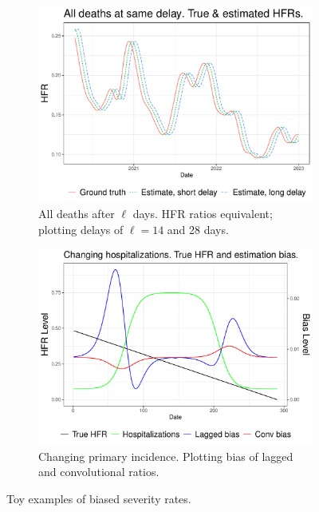\documentclass{article}
\begin{document}
\begin{figure}
     \centering
     \begin{subfigure}[b]{0.45\linewidth}
         \centering
         \includegraphics[width=\linewidth]{Figures/Simulated/sim_onehot.pdf}
         \caption{All deaths after $\ell$ days. HFR ratios equivalent; plotting delays of $\ell=14$ and 28 days.}
         \label{fig:onehot}
     \end{subfigure}
     \hfill
     \begin{subfigure}[b]{0.45\linewidth}
         \centering
         \includegraphics[width=\linewidth]{Figures/Simulated/sim_chging_primary.pdf}
         \caption{Changing primary incidence. Plotting bias of lagged and convolutional ratios.}
         \label{fig:chging_primary}
     \end{subfigure}
        \caption{Toy examples of biased severity rates.}
        \label{fig:bias_ex}
\end{figure}
\end{document}
